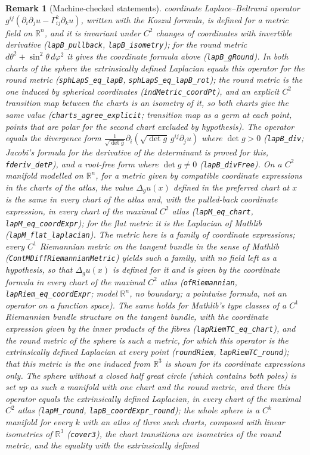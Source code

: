 \documentclass[11pt,a4paper]{article}
\theoremstyle{stmt}
\theoremstyle{defn}
\theoremstyle{rmk}
\newtheorem{remark}[theorem]{Remark}
\numberwithin{equation}{section}
\begin{document}
{\begin{remark}[Machine-checked statements]
coordinate Laplace--Beltrami operator $g^{ij}(\partial_i\partial_ju-\Gamma^k_{ij}\partial_ku)$, written with the Koszul formula, is defined for a metric field on $\mathbb R^n$, and it is invariant under $C^2$ changes of coordinates with invertible derivative (\texttt{lapB\_pullback}, \texttt{lapB\_isometry}); for the round metric $d\theta^2+\sin^2\theta\,d\varphi^2$ it gives the coordinate formula above (\texttt{lapB\_gRound}). In both charts of the sphere the extrinsically defined Laplacian equals this operator for the round metric (\texttt{sphLapS\_eq\_lapB}, \texttt{sphLapS\_eq\_lapB\_rot}); the round metric is the one induced by spherical coordinates (\texttt{indMetric\_coordPt}), and an explicit $C^2$ transition map between the charts is an isometry of it, so both charts give the same value (\texttt{charts\_agree\_explicit}; transition map as a germ at each point, points that are polar for the second chart excluded by hypothesis). The operator equals the divergence form $\frac1{\sqrt{\det g}}\partial_i(\sqrt{\det g}\,g^{ij}\partial_ju)$ where $\det g>0$ (\texttt{lapB\_div}; Jacobi's formula for the derivative of the determinant is proved for this, \texttt{fderiv\_detP}), and a root-free form where $\det g\ne0$ (\texttt{lapB\_divFree}). On a $C^2$ manifold modelled on $\mathbb R^n$, for a metric given by compatible coordinate expressions in the charts of the atlas, the value $\Delta_gu(x)$ defined in the preferred chart at $x$ is the same in every chart of the atlas and, with the pulled-back coordinate expression, in every chart of the maximal $C^2$ atlas (\texttt{lapM\_eq\_chart}, \texttt{lapM\_eq\_coordExpr}); for the flat metric it is the Laplacian of Mathlib (\texttt{lapM\_flat\_laplacian}). The metric here is a family of coordinate expressions; every $C^1$ Riemannian metric on the tangent bundle in the sense of Mathlib (\texttt{ContMDiffRiemannianMetric}) yields such a family, with no field left as a hypothesis, so that $\Delta_gu(x)$ is defined for it and is given by the coordinate formula in every chart of the maximal $C^2$ atlas (\texttt{ofRiemannian}, \texttt{lapRiem\_eq\_coordExpr}; model $\mathbb R^n$, no boundary; a pointwise formula, not an operator on a function space). The same holds for Mathlib's type classes of a $C^1$ Riemannian bundle structure on the tangent bundle, with the coordinate expression given by the inner products of the fibres (\texttt{lapRiemTC\_eq\_chart}), and the round metric of the sphere is such a metric, for which this operator is the extrinsically defined Laplacian at every point (\texttt{roundRiem}, \texttt{lapRiemTC\_round}); that this metric is the one induced from $\mathbb R^3$ is shown for its coordinate expressions only. The sphere without a closed half great circle (which contains both poles) is set up as such a manifold with one chart and the round metric, and there this operator equals the extrinsically defined Laplacian, in every chart of the maximal $C^2$ atlas (\texttt{lapM\_round}, \texttt{lapB\_coordExpr\_round}); the whole sphere is a $C^k$ manifold for every $k$ with an atlas of three such charts, composed with linear isometries of $\mathbb R^3$ (\texttt{cover3}), the chart transitions are isometries of the round metric, and the equality with the extrinsically defined 
\end{remark}}
\end{document}
